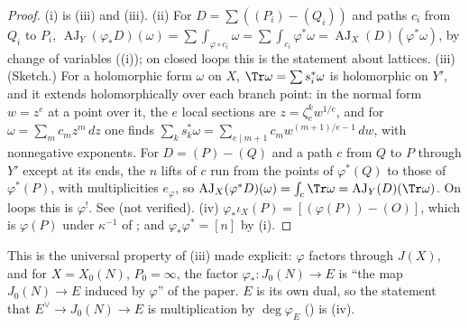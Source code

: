 \begin{proof}
(i) is (iii) and (iii). (ii) For $D=\sum((P_i)-(Q_i))$ and paths $c_i$ from $Q_i$ to $P_i$,
$\operatorname{AJ}_Y(\varphi_*D)(\omega)=\sum\int_{\varphi\circ c_i}\omega=\sum\int_{c_i}\varphi^*\omega=\operatorname{AJ}_X(D)(\varphi^*\omega)$, by change of variables
((i)); on closed loops this is the statement about lattices. (iii) (Sketch.) For a holomorphic form $\omega$ on $X$, $\Tr\omega=\sum s_i^*\omega$ is
holomorphic on $Y'$, and it extends holomorphically over each branch point: in the normal form $w=z^e$ at a point over it, the $e$ local sections are
$z=\zeta_e^kw^{1/e}$, and for $\omega=\sum_mc_mz^m\,dz$ one finds $\sum_ks_k^*\omega=\sum_{e\mid m+1}c_mw^{(m+1)/e-1}\,dw$, with nonnegative exponents. For $D=(P)-(Q)$ and a path $c$
from $Q$ to $P$ through $Y'$ except at its ends, the $n$ lifts of $c$ run from the points of $\varphi^*(Q)$ to those of $\varphi^*(P)$, with multiplicities $e_\varphi$, so
$\operatorname{AJ}_X(\varphi^*D)(\omega)=\int_c\Tr\omega=\operatorname{AJ}_Y(D)(\Tr\omega)$. On loops this is $\varphi^!$. See \cite[Section 6]{MilneJacobian86} (not verified).
(iv) $\varphi_*\iota_X(P)=[(\varphi(P))-(O)]$, which is $\varphi(P)$ under $\kappa^{-1}$ of ; and $\varphi_*\varphi^*=[n]$ by (i).
\end{proof}

This is the universal property of (iii) made explicit: $\varphi$ factors through $J(X)$, and for $X=X_0(N)$, $P_0=\infty$, the factor
$\varphi_*\colon J_0(N)\to E$ is ``the map $J_0(N)\to E$ induced by $\varphi$'' of the paper. $E$ is its own dual, so the statement that $E^\vee\to J_0(N)\to E$ is multiplication by $\deg\varphi_E$
() is (iv).

